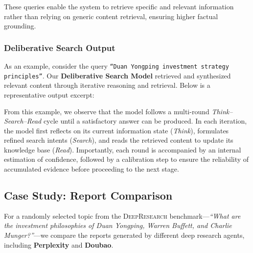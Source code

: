 \documentclass[11pt]{article}
\begin{document}
These queries enable the system to retrieve specific and relevant information rather than relying on generic content retrieval, ensuring higher factual grounding.

\subsubsection{Deliberative Search Output}

As an example, consider the query \texttt{“Duan Yongping investment strategy principles”}. Our \textbf{Deliberative Search Model} retrieved and synthesized relevant content through iterative reasoning and retrieval. Below is a representative output excerpt:

\begin{tcolorbox}[title = {Deliberative Search Model Output}, fontupper=\footnotesize, fontlower=\Large, breakable]

% 
\end{tcolorbox}

From this example, we observe that the model follows a multi-round \textit{Think–Search–Read} cycle until a satisfactory answer can be produced. In each iteration, the model first reflects on its current information state (\textit{Think}), formulates refined search intents (\textit{Search}), and reads the retrieved content to update its knowledge base (\textit{Read}). Importantly, each round is accompanied by an internal estimation of confidence, followed by a calibration step to ensure the reliability of accumulated evidence before proceeding to the next stage.

\subsection{Case Study: Report Comparison}
\label{sec:report-Comparison}
For a randomly selected topic from the \textsc{DeepResearch} benchmark—\textit{“What are the investment philosophies of Duan Yongping, Warren Buffett, and Charlie Munger?”}—we compare the reports generated by different deep research agents, including \textbf{Perplexity} and \textbf{Doubao}.

\begin{tcolorbox}[title = {Ours Report}, fontupper=\footnotesize, fontlower=\Large, breakable]

% 
\end{tcolorbox}
\end{document}
